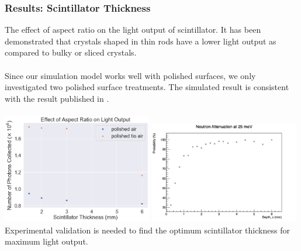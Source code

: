 \documentclass[xcolor=x11names, compress, handout]{beamer}
\renewcommand{\(}{\begin{columns}}
\renewcommand{\)}{\end{columns}}
\newcommand{\<}[1]{\begin{column}{#1}}
\renewcommand{\>}{\end{column}}
\begin{document}
\begin{frame}
  \frametitle{Results: Scintillator Thickness}
  \scriptsize
  The effect of aspect ratio on the light output of scintillator. It has been demonstrated that crystals shaped in thin rods have a lower light output as compared to bulky or sliced crystals. \cite{pauwels_2012} \\
  \ \\
  Since our simulation model works well with polished surfaces, we only investigated two polished surface treatments. The simulated result is consistent with the result published in \cite{pauwels_2012}. \\
  \ \\
  \centering
  \includegraphics[width=0.49\textwidth, height=0.49\textheight]{images/light_yield_thicknesses.png} 
  \includegraphics[width=0.49\textwidth, height=0.49\textheight]{images/gs20_attenuation_simulated.png}
  \flushleft Experimental validation is needed to find the optimum scintillator thickness for maximum light output.
\end{frame}
\end{document}

